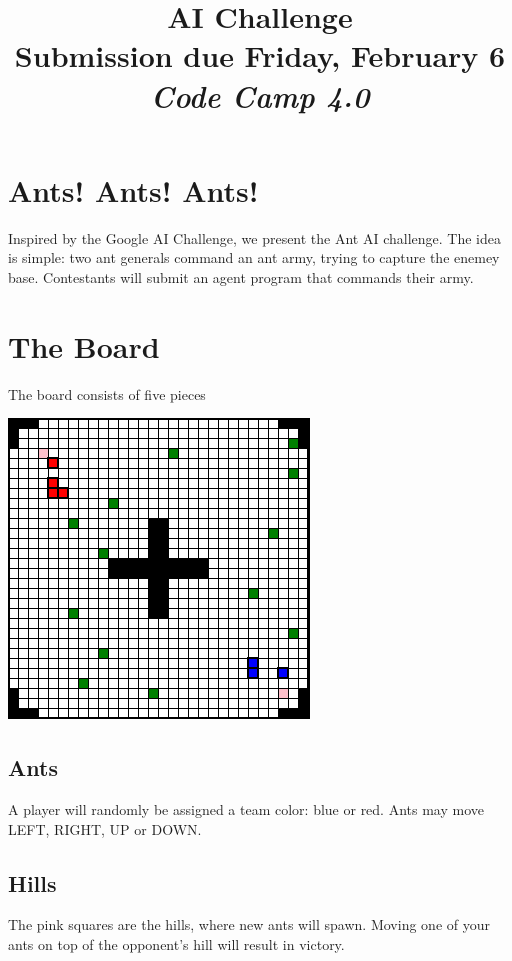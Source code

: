 \documentclass{article}
\title{
\vspace{2in}
\textmd{\textbf{AI Challenge}}\\
\normalsize\vspace{0.1in}\small{Submission due Friday, February 6}\\
\vspace{0.1in}\large{\textit{Code Camp 4.0}}
\vspace{3in}
}
\date{}
\begin{document}
\maketitle
\newpage

\section{Ants! Ants! Ants!}


Inspired by the Google AI Challenge, we present the Ant AI challenge. The idea is simple: two ant generals command an ant army, trying to capture the enemey base. Contestants will submit an agent program that commands their army. 

\section{The Board}

The board consists of five pieces

	\begin{center} 
		\includegraphics[scale=0.5]{exampleBoard.png}
	\end{center}

\subsection{Ants}
A player will randomly be assigned a team color: blue or red. Ants may move LEFT, RIGHT, UP or DOWN.

\subsection{Hills}
The pink squares are the hills, where new ants will spawn. Moving one of your ants on top of the opponent's hill will result in victory.
\end{document}
